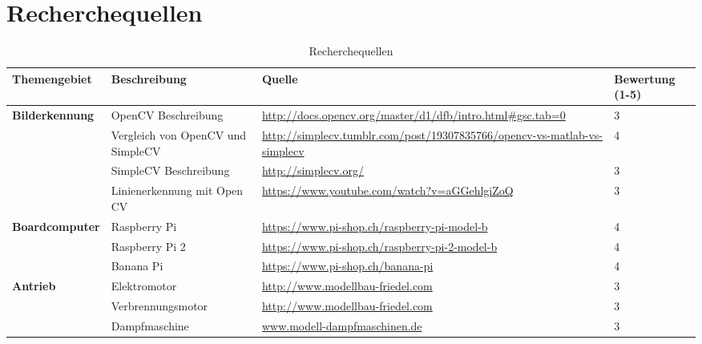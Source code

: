 \section{Recherchequellen}



\begin{table}[h]
\begin{tabular}{|p{3cm}|p{3.5cm}|p{5cm}|p{2cm}|}\hline
	
	\textbf{Themengebiet}	& 	\textbf{Beschreibung} & \textbf{Quelle} & \textbf{Bewertung (1-5)} \\\hline
	
	
	\textbf{Bilderkennung}	&	OpenCV Beschreibung	&	\url{http://docs.opencv.org/master/d1/dfb/intro.html#gsc.tab=0}	&	3 \\\hline
				 			&	Vergleich von OpenCV und SimpleCV	&	\url{http://simplecv.tumblr.com/post/19307835766/opencv-vs-matlab-vs-simplecv}	&	4 \\\hline
				 			&	SimpleCV Beschreibung	&	\url{http://simplecv.org/}	&	3 \\\hline
				 			&	Linienerkennung mit Open CV	&	\url{https://www.youtube.com/watch?v=aGGehlgiZoQ}	&	3	\\\hline
				 			
\textbf{Boardcomputer}	& 	Raspberry Pi & \url{https://www.pi-shop.ch/raspberry-pi-model-b} & 4 \\\hline
						& 	Raspberry Pi 2 & \url{https://www.pi-shop.ch/raspberry-pi-2-model-b} & 4 \\\hline
						& 	Banana Pi & \url{https://www.pi-shop.ch/banana-pi} & 4 \\\hline	
						
\textbf{Antrieb}	& 	Elektromotor & \url{http://www.modellbau-friedel.com} & 3 \\\hline
					& 	Verbrennungsmotor & \url{http://www.modellbau-friedel.com} & 3 \\\hline
					& 	Dampfmaschine & \url{www.modell-dampfmaschinen.de} & 3 \\\hline
	
\end{tabular}\\
\caption{Recherchequellen}
\end{table}